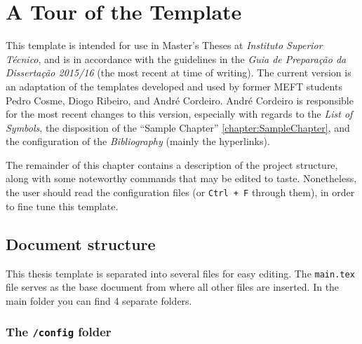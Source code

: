 \chapter{A Tour of the Template}
\label{chapter:template_tour}


This template is intended for use in Master's Theses at \textit{Instituto Superior Técnico}, and is in accordance with the guidelines in the \textit{Guia de Preparação da Dissertação 2015/16} (the most recent at time of writing). The current version is an adaptation of the templates developed and used by former MEFT students Pedro Cosme, Diogo Ribeiro, and André Cordeiro. André Cordeiro is responsible for the most recent changes to this version, especially with regards to the \textit{List of Symbols}, the disposition of the ``Sample Chapter'' \ref{chapter:SampleChapter}, and the configuration of the \textit{Bibliography} (mainly the hyperlinks).

The remainder of this chapter contains a description of the project structure, along with some noteworthy commands that may be edited to taste. Nonetheless, the user should read the configuration files (or \texttt{Ctrl + F} through them), in order to fine tune this template.


\section{Document structure}

This thesis template is separated into several files for easy editing. The \texttt{main.tex} file serves as the base document from where all other files are inserted. In the main folder you can find 4 separate folders.

\subsection{The {\normalfont\texttt{/config}} folder} %

